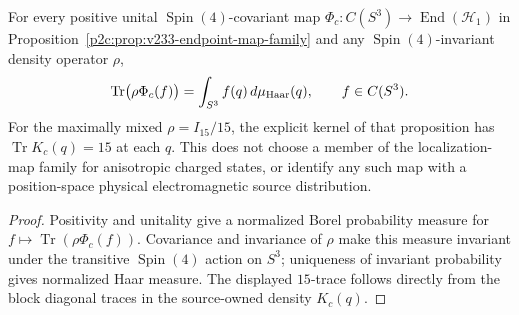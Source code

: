 \documentclass[11pt,a4paper]{article}
\begin{document}
\begin{corollary}
\label{p2c:cor:v340-s3lit-invariant-povm}
For every positive unital $\operatorname{Spin}(4)$-covariant map
$\Phi_c:C(S^3)\to\operatorname{End}(\mathcal H_1)$ in
Proposition~\ref{p2c:prop:v233-endpoint-map-family} and any
$\operatorname{Spin}(4)$-invariant density operator $\rho$,
\[
 \operatorname{Tr}\bigl(\rho\Phi_c(f)\bigr)
 =\int_{S^3}f(q)\,d\mu_{\rm Haar}(q),
 \qquad f\in C(S^3).
\]
For the maximally mixed $\rho=I_{15}/15$, the explicit kernel of
that proposition has $\operatorname{Tr}K_c(q)=15$ at each $q$.
This does not choose a member of the localization-map family for
anisotropic charged states, or identify any such map with a
position-space physical electromagnetic source distribution.
\end{corollary}
\begin{proof}
Positivity and unitality give a normalized Borel probability measure
for $f\mapsto\operatorname{Tr}(\rho\Phi_c(f))$.
Covariance and invariance of $\rho$ make this measure invariant
under the transitive $\operatorname{Spin}(4)$ action on $S^3$;
uniqueness of invariant probability gives normalized Haar measure.
The displayed $15$-trace follows directly from the block diagonal
traces in the source-owned density $K_c(q)$.
\end{proof}
\end{document}

